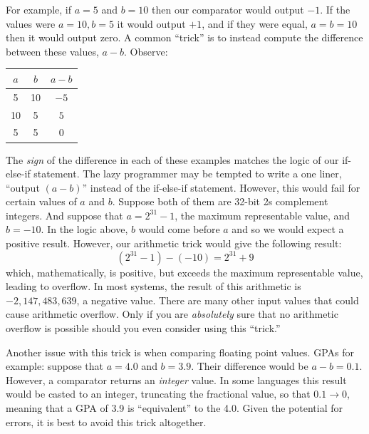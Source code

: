 \begin{algorithm}[H]
\end{algorithm}

For example, if $a = 5$ and $b = 10$ then our comparator would output $-1$.  If
the values were $a = 10, b = 5$ it would output $+1$, and if they were
equal, $a = b = 10$ then it would output zero.  A common ``trick'' is to
instead compute the difference between these values, $a - b$.  Observe:

\begin{center}
\begin{tabular}{ccc}
$a$ & $b$ & $a - b$ \\
\hline\hline
5 & 10 & $-5$ \\
10 & 5 & $5$ \\
5 & 5 & $0$ \\
\end{tabular}
\end{center}

The \emph{sign} of the difference in each of these examples matches the 
logic of our if-else-if statement.  The lazy programmer may be tempted to
write a one liner, ``output $(a - b)$'' instead of the if-else-if statement.
However, this would fail for certain values of $a$ and $b$.  Suppose 
both of them are 32-bit 2s complement integers.  And suppose that 
$a = 2^{31} - 1$, the maximum representable value, and $b = -10$.  In
the logic above, $b$ would come before $a$ and so we would expect a 
positive result.  However, our arithmetic trick would give the following 
result:
  $$(2^{31} - 1) - (-10) = 2^{31} + 9$$
which, mathematically, is positive, but exceeds the maximum representable
value, leading to overflow.  In most systems, the result of this arithmetic
is $-2,147,483,639$, a negative value.  There are many other input values
that could cause arithmetic overflow.  Only if you are \emph{absolutely} 
sure that no arithmetic overflow is possible should you even consider
using this ``trick.''

Another issue with this trick is when comparing floating point values.
GPAs for example: suppose that $a = 4.0$ and $b = 3.9$.  Their difference
would be $a - b = 0.1$.  However, a comparator returns an \emph{integer}
value.  In some languages this result would be casted to an integer, 
truncating the fractional value, so that $0.1 \rightarrow 0$, meaning
that a GPA of 3.9 is ``equivalent'' to the 4.0. Given the potential for 
errors, it is best to avoid this trick altogether.

